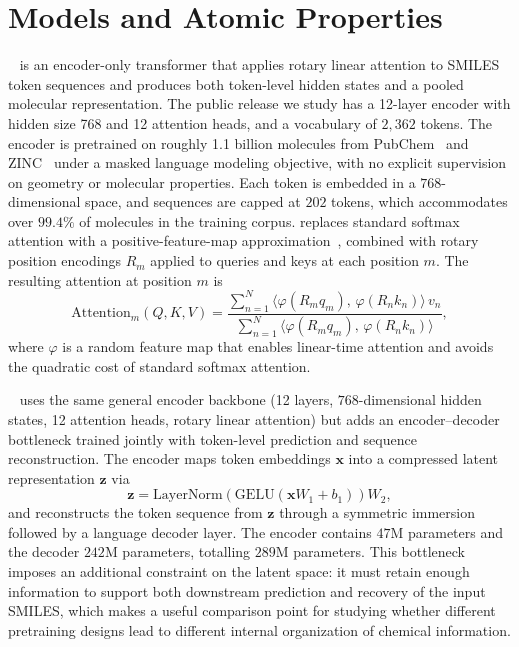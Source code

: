 \section{Models and Atomic Properties}
\label{appendix:architecture}

\molm~\citep{ross2022largescalechemicallanguagerepresentations} is an encoder-only transformer that applies rotary linear attention to SMILES token sequences and produces both token-level hidden states and a pooled molecular representation. The public release we study has a 12-layer encoder with hidden size 768 and 12 attention heads, and a vocabulary of $2{,}362$ tokens. The encoder is pretrained on roughly 1.1 billion molecules from PubChem~\citep{kim2023pubchem} and ZINC~\citep{sterling2015zinc} under a masked language modeling objective, with no explicit supervision on geometry or molecular properties. Each token is embedded in a $768$-dimensional space, and sequences are capped at $202$ tokens, which accommodates over $99.4\%$ of molecules in the training corpus.
\molm replaces standard softmax attention with a positive-feature-map approximation~\citep{choromanski2021rethinking}, combined with rotary position encodings $R_m$ applied to queries and keys at each position $m$. The resulting attention at position $m$ is
\begin{equation}
\text{Attention}_m(Q, K, V) = \frac{\sum_{n=1}^{N} \langle \varphi(R_m q_m),\, \varphi(R_n k_n) \rangle\, v_n}{\sum_{n=1}^{N} \langle \varphi(R_m q_m),\, \varphi(R_n k_n) \rangle},
\end{equation}
where $\varphi$ is a random feature map that enables linear-time attention and avoids the quadratic cost of standard softmax attention.

\smi~\citep{soares2024smi} uses the same general encoder backbone (12 layers, $768$-dimensional hidden states, 12 attention heads, rotary linear attention) but adds an encoder--decoder bottleneck trained jointly with token-level prediction and sequence reconstruction. The encoder maps token embeddings $\mathbf{x}$ into a compressed latent representation $\mathbf{z}$ via
\begin{equation}
\mathbf{z} = \mathrm{LayerNorm}\!\left(\mathrm{GELU}\!\left(\mathbf{x} W_1 + b_1\right)\right) W_2,
\end{equation}
and reconstructs the token sequence from $\mathbf{z}$ through a symmetric immersion followed by a language decoder layer. The encoder contains $47$M parameters and the decoder $242$M parameters, totalling $289$M parameters. This bottleneck imposes an additional constraint on the latent space: it must retain enough information to support both downstream prediction and recovery of the input SMILES, which makes \smi a useful comparison point for studying whether different pretraining designs lead to different internal organization of chemical information.

